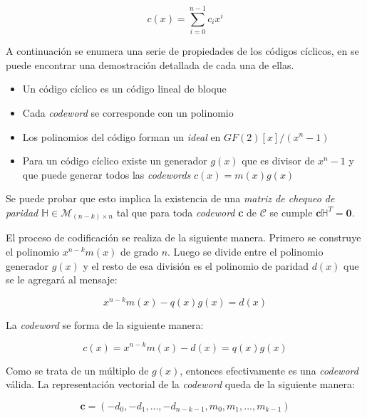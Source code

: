 \begin{equation}
c(x) = \sum_{i = 0}^{n-1}c_i x^i
\end{equation}

A continuación se enumera una serie de propiedades de los códigos cíclicos, en \cite{moon2005error} se puede encontrar una demostración detallada de cada una de ellas.

\begin{itemize}
\item{Un código cíclico es un código lineal de bloque}
\item{Cada \textit{codeword} se corresponde con un polinomio}
\item{Los polinomios del código forman un \textit{ideal} en $GF(2)[x]/(x^n-1)$}
\item{Para un código cíclico existe un generador $g(x)$ que es divisor de $x^n-1$ y que puede generar todos las \textit{codewords} $c(x)=m(x)g(x)$}
\end{itemize}

Se puede probar que esto implica la existencia de una \textit{matriz de chequeo de paridad} $\mathbb{H} \in \mathcal{M}_{(n-k)\times n}$ tal que para toda \textit{codeword} \textbf{c} de $\mathcal{C}$ se cumple $\textbf{c} \mathbb{H} ^T = \textbf{0}$.


El proceso de codificación se realiza de la siguiente manera. Primero se construye el polinomio $x^{n-k}m(x)$ de grado $n$. Luego se divide entre el polinomio generador $g(x)$ y el resto de esa división es el polinomio de paridad $d(x)$ que se le agregará al mensaje:

\begin{equation}
x^{n-k}m(x) - q(x)g(x) = d(x)
\end{equation}

La \textit{codeword} se forma de la siguiente manera:

\begin{equation}
c(x) = x^{n-k}m(x)-d(x) = q(x)g(x)
\end{equation}

Como se trata de un múltiplo de $g(x)$, entonces efectivamente es una \textit{codeword} válida. La representación vectorial de la \textit{codeword} queda de la siguiente manera:

\begin{equation}
\textbf{c} = (-d_0, -d_1, ..., -d_{n-k-1}, m_0, m_1, ..., m_{k-1})
\end{equation}

